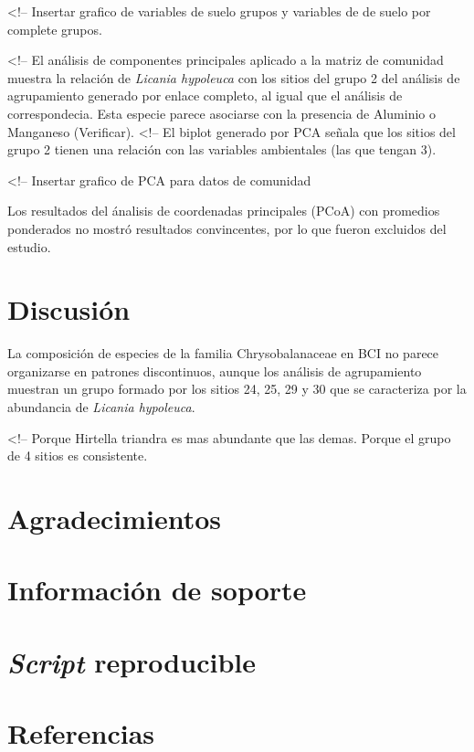 \documentclass[11pt,]{article}
\begin{document}
\textless{}!-- Insertar grafico de variables de suelo grupos y variables
de de suelo por complete grupos.

\textless{}!-- El análisis de componentes principales aplicado a la
matriz de comunidad muestra la relación de \emph{Licania hypoleuca} con
los sitios del grupo 2 del análisis de agrupamiento generado por enlace
completo, al igual que el análisis de correspondecia. Esta especie
parece asociarse con la presencia de Aluminio o Manganeso (Verificar).
\textless{}!-- El biplot generado por PCA señala que los sitios del
grupo 2 tienen una relación con las variables ambientales (las que
tengan 3).

\textless{}!-- Insertar grafico de PCA para datos de comunidad

Los resultados del ánalisis de coordenadas principales (PCoA) con
promedios ponderados no mostró resultados convincentes, por lo que
fueron excluidos del estudio.

\section{Discusión}\label{discusiuxf3n}

La composición de especies de la familia Chrysobalanaceae en BCI no
parece organizarse en patrones discontinuos, aunque los análisis de
agrupamiento muestran un grupo formado por los sitios 24, 25, 29 y 30
que se caracteriza por la abundancia de \emph{Licania hypoleuca}.

\textless{}!-- Porque Hirtella triandra es mas abundante que las demas.
Porque el grupo de 4 sitios es consistente.

\section{Agradecimientos}\label{agradecimientos}

\section{Información de soporte}\label{informaciuxf3n-de-soporte}

\section{\texorpdfstring{\emph{Script}
reproducible}{Script reproducible}}\label{script-reproducible}

\section*{Referencias}\label{referencias}
\end{document}
